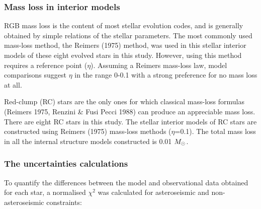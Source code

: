 \documentclass[a4paper,fleqn,usenatbib]{mnras}     %
\begin{document}
{\subsubsection{Mass loss in interior models}
RGB mass loss is the content of most stellar 
evolution codes, and is generally obtained by 
simple relations of the stellar parameters.
The most commonly used mass-loss method, 
the Reimers (1975) method, 
was used in this stellar interior models 
of these eight evolved stars in this study.
However, using this method requires a reference point ($\eta$).
Assuming a Reimers mass-loss law, 
model comparisons suggest $\eta$ in the range 
0-0.1 with a strong preference for no mass loss at all.

Red-clump (RC) stars are the only ones for which classical mass-loss
formulas (Reimers 1975, Renzini \& Fusi Pecci 1988)
can produce an appreciable mass loss.
There are eight RC stars in this study.
The stellar
interior models of RC stars are 
constructed using Reimers (1975) mass-loss methods ($\eta$=0.1). 
The total mass loss in all the internal structure 
models constructed is 0.01 $M_{\rm \odot}$.

\subsubsection{The uncertainties calculations}
To quantify the differences between 
the model and observational data 
obtained for each star, a normalised 
$\chi^2$ was calculated for 
asteroseismic and non-asteroseismic constraints:

}
\end{document}
